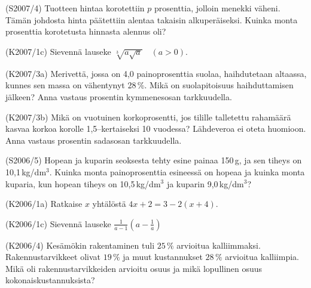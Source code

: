\begin{tehtava}(S2007/4)   Tuotteen hintaa korotettiin $p$ prosenttia, jolloin menekki väheni.
                        Tämän johdosta hinta päätettiin alentaa takaisin alkuperäiseksi.
                        Kuinka monta prosenttia korotetusta hinnasta alennus oli?
\end{tehtava}

\begin{tehtava}(K2007/1c)  Sievennä lauseke $ \sqrt[3]{a \sqrt{a}} \quad (a > 0) $.
\end{tehtava}

\begin{tehtava}(K2007/3a)  Merivettä, jossa on 4,0 painoprosenttia suolaa, haihdutetaan
                        altaassa, kunnes sen massa on vähentynyt 28\,\%. Mikä on
                        suolapitoisuus haihduttamisen jälkeen? Anna vastaus prosentin
                        kymmenesosan tarkkuudella. 
\end{tehtava}

\begin{tehtava}(K2007/3b)  Mikä on vuotuinen korkoprosentti, jos tilille talletettu rahamäärä
                        kasvaa korkoa korolle 1,5--kertaiseksi 10 vuodessa? Lähdeveroa
                        ei oteta huomioon. Anna vastaus prosentin sadasosan 
                        tarkkuudella.
\end{tehtava}

\begin{tehtava}(S2006/5)   Hopean ja kuparin seoksesta tehty esine painaa 150\,g, ja sen
                       tiheys on 10,1\,kg/dm\(^3\). Kuinka monta painoprosenttia 
                        esineessä on hopeaa ja kuinka monta kuparia, kun hopean tiheys on 
                        10,5\,kg/dm\(^3\) ja kuparin 9,0\,kg/dm\(^3\)?
\end{tehtava}

\begin{tehtava}(K2006/1a)  Ratkaise $x$ yhtälöstä $4x + 2 =  3 - 2(x + 4)$.
\end{tehtava}

\begin{tehtava}(K2006/1c)  Sievennä lauseke 
                        $ \frac{1}{a - 1} \left( a - \frac{1}{a} \right) $
\end{tehtava}

\begin{tehtava}(K2006/4)   Kesämökin rakentaminen tuli $25\,\%$ arvioitua kalliimmaksi.
 Rakennustarvikkeet olivat $19\,\%$ ja muut kustannukset $28\,\% $
                        arvioitua kalliimpia. Mikä oli rakennustarvikkeiden arvioitu osuus ja 
                        mikä lopullinen osuus kokonaiskustannuksista?
\end{tehtava}

